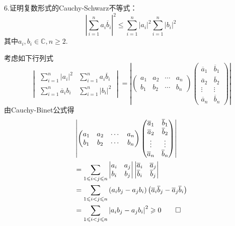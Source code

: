 6.证明复数形式的Cauchy-Schwarz不等式：
\[
\left|\sum_{i=1}^{n}a_i\overline{b}_i\right|^2\leqslant\sum_{i=1}^{n}\left|a_i\right|^2\sum_{i=1}^{n}\left|b_i\right|^2
\]
其中$a_i,b_i\in\mathbb{C},n\geqslant 2.$
\begin{Proof}
考虑如下行列式
\[
\begin{vmatrix}
    \sum\limits_{i=1}^{n}\left|a_i\right|^2&
    \sum\limits_{i=1}^{n}a_i\overline{b}_i\\
    \sum\limits_{i=1}^{n}\overline{a}_ib_i&
    \sum\limits_{i=1}^{n}\left|b_i\right|^2
\end{vmatrix}=
\left|
    \begin{pmatrix}
        a_1&a_2&\cdots&a_n\\
        b_1&b_2&\cdots&b_n 
    \end{pmatrix}
    \begin{pmatrix}
        \overline{a}_1&\overline{b}_1\\
        \overline{a}_2&\overline{b}_2\\
        \vdots&\vdots\\
        \overline{a}_n&\overline{b}_n
    \end{pmatrix}
\right|
\]
由Cauchy-Binet公式得
\begin{align*}
    &\left|
        \begin{pmatrix}
            a_1&a_2&\cdots&a_n\\
            b_1&b_2&\cdots&b_n 
        \end{pmatrix}
        \begin{pmatrix}
            \overline{a}_1&\overline{b}_1\\
            \overline{a}_2&\overline{b}_2\\
            \vdots&\vdots\\
            \overline{a}_n&\overline{b}_n
        \end{pmatrix}
    \right|\\
    &=\sum_{1\leqslant i<j\leqslant n}
    \begin{vmatrix}
        a_i&a_j\\
        b_i&b_j
    \end{vmatrix}
    \begin{vmatrix}
        \overline{a}_i&\overline{a}_j\\
        \overline{b}_i&\overline{b}_j
    \end{vmatrix}\\
    &=\sum_{1\leqslant i<j\leqslant n}
    \left(
        a_ib_j-a_jb_i
    \right)\left(
        \overline{a}_i\overline{b}_j-\overline{a}_j\overline{b}_i
    \right)\\
    &=\sum_{1\leqslant i<j\leqslant n}
    \left|
        a_ib_j-a_jb_i 
    \right|^2\geqslant 0\qedhere
\end{align*}
\end{Proof}
